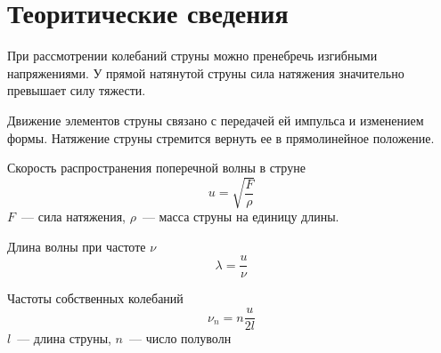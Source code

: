 \section{Теоритические сведения}
При рассмотрении колебаний струны можно пренебречь изгибными напряжениями.
У прямой натянутой струны сила натяжения значительно превышает силу тяжести.

Движение элементов струны связано с передачей ей импульса и изменением формы.
Натяжение струны стремится вернуть ее в прямолинейное положение.

Скорость распространения поперечной волны в струне
\[u=\sqrt{\frac{F}{\rho}}\]
$F$~--- сила натяжения, $\rho$~--- масса струны на единицу длины.

Длина волны при частоте $\nu$
\[\lambda=\frac{u}{\nu}\]

Частоты собственных колебаний
\[\nu_n=n\frac{u}{2l}\]
$l$~--- длина струны, $n$~--- число полуволн
